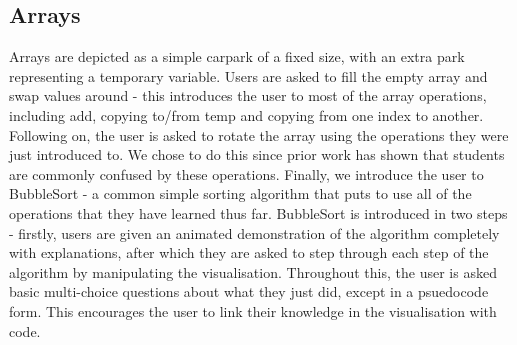 \documentclass[10pt]{article}
\begin{document}
\subsection{Arrays}
Arrays are depicted as a simple carpark of a fixed size, with an extra park representing a temporary variable. Users are asked to fill the empty array and swap values around - this introduces the user to most of the array operations, including add, copying to/from temp and copying from one index to another. Following on, the user is asked to rotate the array using the operations they were just introduced to. We chose to do this since prior work\cite{izuloop} has shown that students are commonly confused by these operations. Finally, we introduce the user to BubbleSort - a common simple sorting algorithm that puts to use all of the operations that they have learned thus far. BubbleSort is introduced in two steps - firstly, users are given an animated demonstration of the algorithm completely with explanations, after which they are asked to step through each step of the algorithm by manipulating the visualisation. Throughout this, the user is asked basic multi-choice questions about what they just did, except in a psuedocode form. This encourages the user to link their knowledge in the visualisation with code.
\end{document}

